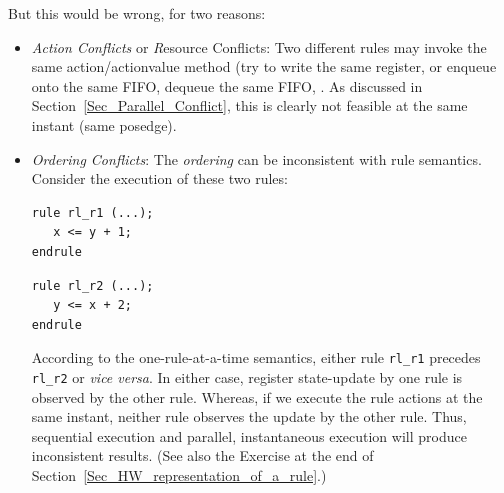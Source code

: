 But this would be wrong, for two reasons:

\begin{itemize}

 \item \emph{Action Conflicts} or {\emph Resource Conflicts}: Two
       different rules may invoke the same action/actionvalue method
       (try to write the same register, or enqueue onto the same FIFO,
       dequeue the same FIFO, {\etc}.  As discussed in
       Section~\ref{Sec_Parallel_Conflict}, this is clearly not
       feasible at the same instant (same posedge).

 \item \emph{Ordering Conflicts}: The \emph{ordering} can be
       inconsistent with rule semantics.  Consider the execution of
       these two rules:

       \begin{center}
       \begin{minipage}{2.5in}
        {\small
        \begin{Verbatim}[frame=single, label=BSV]
rule rl_r1 (...);
   x <= y + 1;
endrule
        \end{Verbatim}
        }
       \end{minipage}
       \hmm
       \begin{minipage}{2.5in}
        {\small
        \begin{Verbatim}[frame=single,label=BSV]
rule rl_r2 (...);
   y <= x + 2;
endrule
        \end{Verbatim}
        }
       \end{minipage}
       \end{center}

       According to the one-rule-at-a-time semantics, either rule
       \verb|rl_r1| precedes \verb|rl_r2| or \emph{vice versa}.  In
       either case, register state-update by one rule is observed by
       the other rule.  Whereas, if we execute the rule actions at the
       same instant, neither rule observes the update by the other
       rule.  Thus, sequential execution and parallel, instantaneous
       execution will produce inconsistent results. (See also the
       Exercise at the end of
       Section~\ref{Sec_HW_representation_of_a_rule}.)

\end{itemize}

